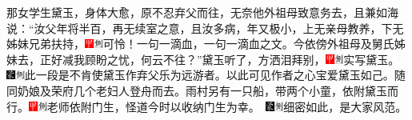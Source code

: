那女学生黛玉，身体大愈，原不忍弃父而往，无奈他外祖母致意务去，且兼如海说：``汝父年将半百，再无续室之意，且汝多病，年又极小，上无亲母教养，下无姊妹兄弟扶持，{\includegraphics[width=3mm]{../Images/00002}\includegraphics[width=3mm]{../Images/00011}\footnotesize \kaishu 可怜！一句一滴血，一句一滴血之文。}今依傍外祖母及舅氏姊妹去，正好减我顾盼之忧，何云不往？''黛玉听了，方洒泪拜别，{{\includegraphics[width=3mm]{../Images/00002}\includegraphics[width=3mm]{../Images/00011}\footnotesize \kaishu 实写黛玉。　}\includegraphics[width=3mm]{../Images/00006}\includegraphics[width=3mm]{../Images/00011}\footnotesize \kaishu 此一段是不肯使黛玉作弃父乐为远游者。以此可见作者之心宝爱黛玉如己。}随同奶娘及荣府几个老妇人登舟而去。雨村另有一只船，带两个小童，依附黛玉而行。{{\includegraphics[width=3mm]{../Images/00002}\includegraphics[width=3mm]{../Images/00011}\footnotesize \kaishu 老师依附门生，怪道今时以收纳门生为幸。　}\includegraphics[width=3mm]{../Images/00006}\includegraphics[width=3mm]{../Images/00011}\footnotesize \kaishu 细密如此，是大家风范。}

